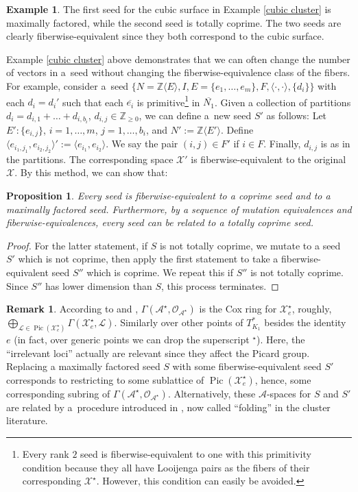 \documentclass[10pt,a4paper]{amsart}
\numberwithin{equation}{section}
\numberwithin{figure}{section}
\numberwithin{table}{section}
\DeclareMathOperator{\Pic}{Pic}
\let\?=\overline
\let\bb=\mathbb
\let\s=\mathcal
\newtheorem{prop}[thm]{Proposition}
\theoremstyle{definition}
\newtheorem{eg}[thm]{Example}
\newtheorem{rmk}[thm]{Remark}
\begin{document}
\begin{eg}The first seed for the cubic surface in Example \ref{cubic cluster} is maximally factored, while the second seed is totally coprime. The two seeds are clearly fiberwise-equivalent since they both correspond to the cubic surface.
\end{eg}

 Example \ref{cubic cluster} above demonstrates that we can often change the number of vectors in a~seed without changing the fiberwise-equivalence class of the fibers. For example, consider a~seed $\{N=\bb{Z}\langle E \rangle, I,E=\{e_1,\dots,e_m\},F, \langle \cdot, \cdot \rangle, \{d_i\}\}$ with each $d_i=d_i'$ such that each $\?{e_i}$ is primitive\footnote{Every rank $2$ seed is fiberwise-equivalent to one with this primitivity condition because they all have Looijenga pairs as the fibers of their corresponding $\s{X}^{\star}$. However, this condition can easily be avoided.} in $\?{N_1}$. Given a collection of partitions $d_i=d_{i,1}+\dots+d_{i,b_i}$, $d_{i,j}\in \bb{Z}_{\geq 0}$, we can define a~new seed $S'$ as follows: Let $E'\colon \{e_{i,j}\}$, $i=1,\dots,m$, $j=1,\dots,b_i$, and $N':=\bb{Z}\langle E' \rangle$. Define $\langle e_{i_1,j_1},e_{i_2,j_2}\rangle':=\langle e_{i_1},e_{i_2}\rangle$. We say the pair $(i,j)\in F'$ if $i\in F$. Finally, $d_{i,j}$ is as in the partitions. The corresponding space $\s{X}'$ is fiberwise-equivalent to the original $\s{X}$. By this method, we can show that:
\begin{prop}\label{CoprimeEquiv}
Every seed is fiberwise-equivalent to a coprime seed and to a maximally factored seed. Furthermore, by a sequence of mutation equivalences and fiberwise-equivalences, every seed can be related to a totally coprime seed.
\end{prop}
\begin{proof}For the latter statement, if $S$ is not totally coprime, we mutate to a seed $S'$ which is not coprime, then apply the first statement to take a fiberwise-equivalent seed $S''$ which is coprime. We repeat this if $S''$ is not totally coprime. Since $S''$ has lower dimension than $S$, this process terminates.
\end{proof}

\begin{rmk}\label{Cox}According to \cite[Section~4]{GHK3} and \cite{ManCox}, $\Gamma(\s{A}^{\star},\s{O}_{\s{A}^{\star}})$ is the Cox ring for $\s{X}^{\star}_e$, roughly, $\bigoplus_{\s{L}\in \Pic(\s{X}_e^{\star})} \Gamma(\s{X}_e^{\star},\s{L})$. Similarly over other points of $T_{K_1}^*$ besides the identity $e$ (in fact, over generic points we can drop the superscript $\left.^\star\right.$). Here, the ``irrelevant loci'' actually are relevant since they affect the Picard group. Replacing a maximally factored seed $S$ with some fiberwise-equivalent seed $S'$ corresponds to restricting to some sublattice of $\Pic(\s{X}_e^{\star})$, hence, some corresponding subring of $\Gamma(\s{A}^{\star},\s{O}_{\s{A}^{\star}})$. Alternatively, these $\s{A}$-spaces for $S$ and $S'$ are related by a~procedure introduced in \cite{Dup}, now called ``folding'' in the cluster literature.
\end{rmk}
\end{document}
